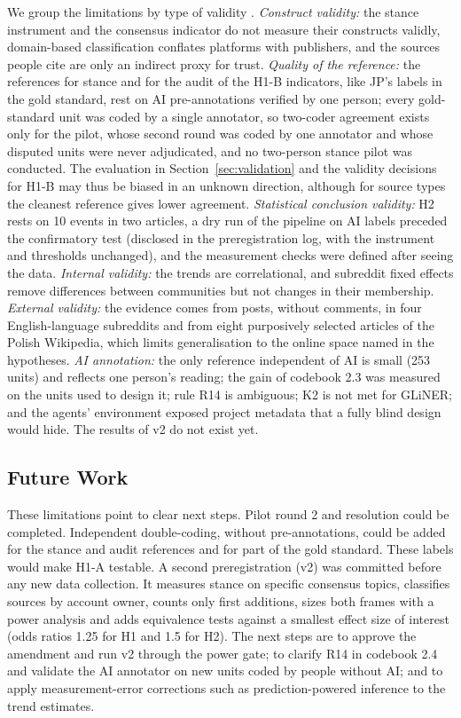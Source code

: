 \documentclass[10pt,a4paper]{article}
\begin{document}
We group the limitations by type of validity \cite{shadish2002}. \emph{Construct
validity:} the stance instrument and the consensus indicator do not measure their
constructs validly, domain-based classification conflates platforms with publishers, and
the sources people cite are only an indirect proxy for trust. \emph{Quality of the
reference:} the references for stance and for the audit of the H1-B indicators, like JP's labels in the gold standard, rest on AI pre-annotations verified by one person; every gold-standard unit was coded by a single annotator, so two-coder
agreement exists only for the pilot, whose second round was coded by one annotator and
whose disputed units were never adjudicated, and no two-person stance pilot was
conducted. The evaluation in Section~\ref{sec:validation} and the validity decisions for H1-B may thus be
biased in an unknown direction, although for source types the cleanest reference gives
lower agreement. \emph{Statistical conclusion validity:} H2 rests on
10 events in two articles, a dry run of the pipeline on AI labels
preceded the confirmatory test (disclosed in the preregistration log, with the instrument
and thresholds unchanged), and the measurement checks were defined after seeing the data.
\emph{Internal validity:} the trends are correlational, and subreddit fixed effects remove
differences between communities but not changes in their membership. \emph{External
validity:} the evidence comes from posts, without comments, in four English-language
subreddits and from eight purposively selected articles of the Polish Wikipedia, which
limits generalisation to the online space named in the hypotheses.
\emph{AI annotation:} the only reference independent of AI is small (253 units) and reflects
one person's reading; the gain of codebook 2.3 was measured on the units used to design it;
rule R14 is ambiguous; K2 is not met for GLiNER; and the agents' environment exposed project
metadata that a fully blind design would hide. The results of v2 do not exist yet.

\subsection{Future Work}

These limitations point to clear next steps. Pilot round 2 and resolution could be
completed. Independent double-coding, without pre-annotations, could be added for the
stance and audit references and for part of the gold standard. These labels would make
H1-A testable. A second preregistration (v2) was committed before any new data collection.
It measures stance on specific consensus topics, classifies sources by
account owner, counts only first additions, sizes both frames with a power analysis and adds
equivalence tests against a smallest effect size of interest (odds ratios 1.25 for H1 and 1.5
for H2).
The next steps are to approve the amendment and run v2 through the power gate; to clarify R14
in codebook 2.4 and validate the AI annotator on new units coded by people without AI; and to
apply measurement-error corrections such as prediction-powered inference
\cite{angelopoulos2023} to the trend estimates.
\end{document}
